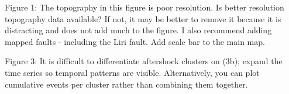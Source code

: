 \documentclass[10pt]{extarticle}
\begin{document}
\begin{ReviewerComment}{2}
\noindent 
Figure 1: The topography in this figure is poor resolution. Is better resolution topography data available? If not, it may be better to remove it because it is distracting and does not add much to the figure. I also recommend adding mapped faults - including the Liri fault. Add scale bar to the main map.

\end{ReviewerComment}


\begin{Answer}
 \WorkInProgressRevTask
\end{Answer}
%
%



\begin{ReviewerComment}{2}
\noindent 
Figure 3: It is difficult to differentiate aftershock clusters on (3b); expand the time series so temporal patterns are visible. Alternatively, you can plot cumulative events per cluster rather than combining them together.  

\end{ReviewerComment}
\end{document}
